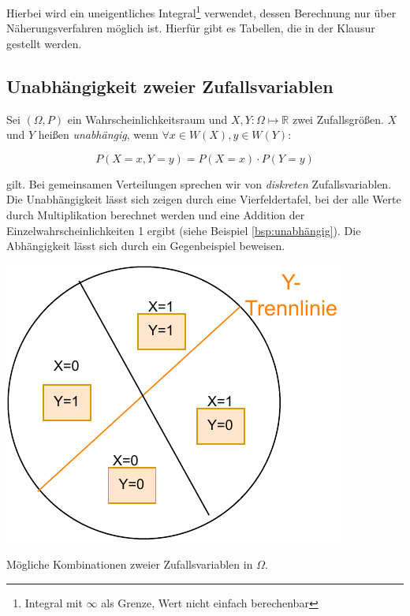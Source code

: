 \documentclass{tufte-handout}
\theoremstyle{own}
\begin{document}
Hierbei wird ein uneigentliches Integral\footnote{Integral mit $\infty$ als Grenze, Wert nicht einfach berechenbar} verwendet, dessen Berechnung nur über Näherungsverfahren möglich ist. 
Hierfür gibt es Tabellen, die in der Klausur gestellt werden.

\subsection{Unabhängigkeit zweier Zufallsvariablen}

Sei $(\Omega, P)$ ein Wahrscheinlichkeitsraum und $X,Y : \Omega \mapsto \mathbb{R}$ zwei Zufallsgrößen.
$X$ und $Y$ heißen \emph{unabhängig}, wenn $\forall x \in W(X), y \in W(Y)$:

\begin{equation}
	P(X=x, Y=y) = P(X=x) \cdot P(Y=y)
\end{equation}

gilt. Bei gemeinsamen Verteilungen sprechen wir von \emph{diskreten} Zufallsvariablen.
Die Unabhängigkeit lässt sich zeigen durch eine Vierfeldertafel, bei der alle
Werte durch Multiplikation berechnet werden und eine Addition der Einzelwahrscheinlichkeiten
1 ergibt (siehe Beispiel \ref{bsp:unabhängig}). Die Abhängigkeit lässt sich 
durch ein Gegenbeispiel beweisen.

\begin{marginfigure}
  \includegraphics{zweizufallsvariablen}
  \caption{Mögliche Kombinationen zweier Zufallsvariablen in $\Omega$.}
\end{marginfigure}
\end{document}
